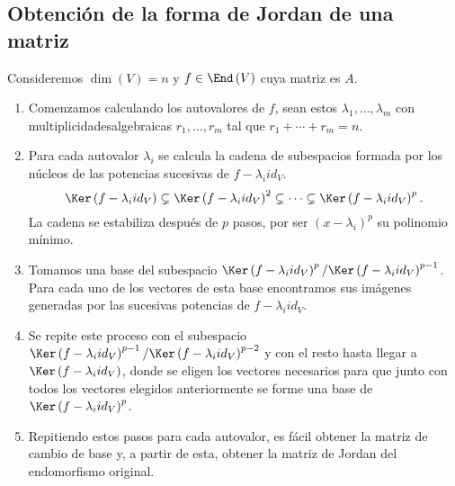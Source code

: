 \subsection*{Obtención de la forma de Jordan de una matriz}
Consideremos $\displaystyle \dim\left(V\right) = n $ y $\displaystyle f \in \End\left(V\right) $ cuya matriz es $\displaystyle A $.
\begin{enumerate}
\item Comenzamos calculando los autovalores de $\displaystyle f $, sean estos $\displaystyle \lambda_{1}, \ldots, \lambda_{m} $ con multiplicidadesalgebraicas $\displaystyle r_{1}, \ldots, r_{m} $ tal que $\displaystyle r_{1} + \cdots + r_{m} = n $. 
\item Para cada autovalor $\displaystyle \lambda_{i} $ se calcula la cadena de subespacios formada por los núcleos de las potencias sucesivas de $\displaystyle f - \lambda_{i}id _{V} $. 
	\[\Ker\left(f - \lambda_{i}id _{V}\right) \subsetneq \Ker\left(f - \lambda_{i}id _{V}\right)^{2} \subsetneq \cdots \subsetneq \Ker\left(f - \lambda_{i}id _{V}\right)^{p} .\]
	La cadena se estabiliza después de $\displaystyle p $ pasos, por ser $\displaystyle \left(x - \lambda_{i}\right)^{p} $ su polinomio mínimo. 
\item Tomamos una base del subespacio $\displaystyle \Ker\left(f - \lambda_{i}id _{V}\right)^{p} / \Ker\left(f - \lambda_{i}id _{V}\right)^{p-1} $. Para cada uno de los vectores de esta base encontramos sus imágenes generadas por las sucesivas potencias de $\displaystyle f - \lambda_{i}id _{V} $.
\item Se repite este proceso con el subespacio $\displaystyle \Ker\left(f - \lambda_{i}id _{V}\right)^{p-1}/\Ker\left(f - \lambda_{i}id _{V}\right)^{p-2} $ y con el resto hasta llegar a $\displaystyle \Ker\left(f - \lambda_{i}id _{V}\right) $, donde se eligen los vectores necesarios para que junto con todos los vectores elegidos anteriormente se forme una base de $\displaystyle \Ker\left(f - \lambda_{i}id _{V}\right)^{p} $.
\item Repitiendo estos pasos para cada autovalor, es fácil obtener la matriz de cambio de base y, a partir de esta, obtener la matriz de Jordan del endomorfismo original.
\end{enumerate}

